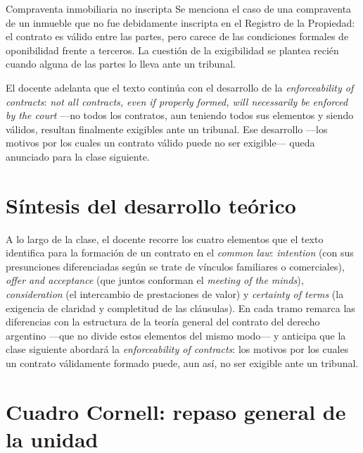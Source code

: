 \documentclass[12pt,oneside]{book}
\begin{document}
\begin{example}{Compraventa inmobiliaria no inscripta}
Se menciona el caso de una compraventa de un inmueble que no fue debidamente inscripta en el Registro de la Propiedad: el contrato es válido entre las partes, pero carece de las condiciones formales de oponibilidad frente a terceros. La cuestión de la exigibilidad se plantea recién cuando alguna de las partes lo lleva ante un tribunal.
\end{example}

El docente adelanta que el texto continúa con el desarrollo de la \textit{enforceability of contracts}: \textit{not all contracts, even if properly formed, will necessarily be enforced by the court} —no todos los contratos, aun teniendo todos sus elementos y siendo válidos, resultan finalmente exigibles ante un tribunal. Ese desarrollo —los motivos por los cuales un contrato válido puede no ser exigible— queda anunciado para la clase siguiente.

\section*{Síntesis del desarrollo teórico}

A lo largo de la clase, el docente recorre los cuatro elementos que el texto identifica para la formación de un contrato en el \textit{common law}: \textit{intention} (con sus presunciones diferenciadas según se trate de vínculos familiares o comerciales), \textit{offer and acceptance} (que juntos conforman el \textit{meeting of the minds}), \textit{consideration} (el intercambio de prestaciones de valor) y \textit{certainty of terms} (la exigencia de claridad y completitud de las cláusulas). En cada tramo remarca las diferencias con la estructura de la teoría general del contrato del derecho argentino —que no divide estos elementos del mismo modo— y anticipa que la clase siguiente abordará la \textit{enforceability of contracts}: los motivos por los cuales un contrato válidamente formado puede, aun así, no ser exigible ante un tribunal.

\section*{Cuadro Cornell: repaso general de la unidad}
\end{document}
